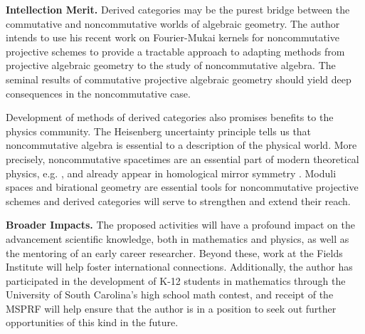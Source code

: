 \documentclass[11pt]{article}
\begin{document}



\noindent\textbf{Intellection Merit.}
Derived categories may be the purest bridge between the commutative and noncommutative worlds of algebraic geometry.
The author intends to use his recent work on Fourier-Mukai kernels for noncommutative projective schemes to provide a tractable approach to adapting methods from projective algebraic geometry to the study of noncommutative algebra.
The seminal results of commutative projective algebraic geometry should yield deep consequences in the noncommutative case.

Development of methods of derived categories also promises benefits to the physics community.
The Heisenberg uncertainty principle tells us that noncommutative algebra is essential to a description of the physical world.
More precisely, noncommutative spacetimes are an essential part of modern theoretical physics, e.g. \cite{DoNe01}, and already appear in homological mirror symmetry \cite{AKO08}.
Moduli spaces and birational geometry are essential tools for noncommutative projective schemes and derived categories will serve to strengthen and extend their reach.

\noindent\textbf{Broader Impacts.}
The proposed activities will have a profound impact on the advancement scientific knowledge, both in mathematics and physics, as well as the mentoring of an early career researcher.
Beyond these, work at the Fields Institute will help foster international connections.
Additionally, the author has participated in the development of K-12 students in mathematics through the University of South Carolina's high school math contest, and receipt of the MSPRF will help ensure that the author is in a position to seek out further opportunities of this kind in the future.

\end{document}
